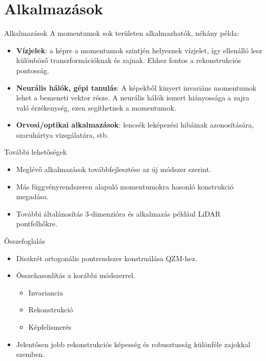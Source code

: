 \documentclass{beamer}
\begin{document}
\section{Alkalmazások}
\begin{frame}{Alkalmazások}
    A momentumok sok területen alkalmazhatók, néhány példa:
    \begin{itemize}
    \item \textbf{Vízjelek}: a képre a momentumok szintjén helyeznek vízjelet, így ellenálló lesz különböző transzformációknak és zajnak. Ehhez fontos a rekonstrukciós pontosság.
    \item \textbf{Neurális hálók, gépi tanulás}: A képekből kinyert invariáns momentumok lehet a bemeneti vektor része. A neurális hálók ismert hiányossága a zajra való érzékenység, ezen segíthetnek a momentumok.
    \item \textbf{Orvosi/optikai alkalmazások}: lencsék leképezési hibáinak azonosítására, szaruhártya vizsgálatára, stb.
    \end{itemize}
\end{frame}

\begin{frame}{További lehetőségek}
    \begin{itemize}
    \item Meglévő alkalmazások továbbfejlesztése az új módszer szerint.
    \item Más függvényrendszeren alapuló momentumokra hasonló konstrukció megadása.
    \item További általánosítás 3-dimenzióra és alkalmazás például LiDAR pontfelhőkre.
    \end{itemize}
\end{frame}

\begin{frame}{Összefoglalás}
    \begin{itemize}
    \item Diszkrét ortogonális pontrendszer konstruálása QZM-hez.
    \item Összehasonlítás a korábbi módszerrel.
        \begin{itemize}
        \item Invariancia
        \item Rekonstrukció
        \item Képfelismerés
        \end{itemize}
    \item Jelentősen jobb rekonstrukciós képesség és robusztusság különféle zajokkal szemben.
    \end{itemize}
\end{frame}
\end{document}
